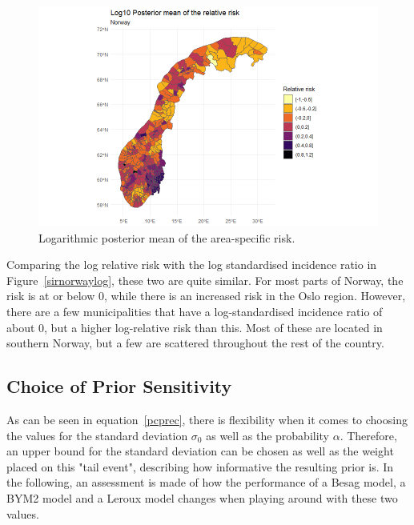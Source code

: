 \begin{figure}[H]
    \centering
    \includegraphics[width = \textwidth]{posterior_norway_log.png}
    \caption{Logarithmic posterior mean of the area-specific risk.}
    \label{posteriorNorwayLog}
\end{figure}
%     
Comparing the log relative risk with the log standardised incidence ratio in Figure~\ref{sirnorwaylog}, these two are quite similar. For most parts of Norway, the risk is at or below 0, while there is an increased risk in the Oslo region. However, there are a few municipalities that have a log-standardised incidence ratio of about 0, but a higher log-relative risk than this. Most of these are located in southern Norway, but a few are scattered throughout the rest of the country.
\clearpage
\subsection{Choice of Prior Sensitivity}
As can be seen in equation~\ref{pcprec}, there is flexibility when it comes to choosing the values for the standard deviation $\sigma_0$ as well as the probability $\alpha$. Therefore, an upper bound for the standard deviation can be chosen as well as the weight placed on this "tail event", describing how informative the resulting prior is. In the following, an assessment is made of how the performance of a Besag model, a BYM2 model and a Leroux model changes when playing around with these two values.

